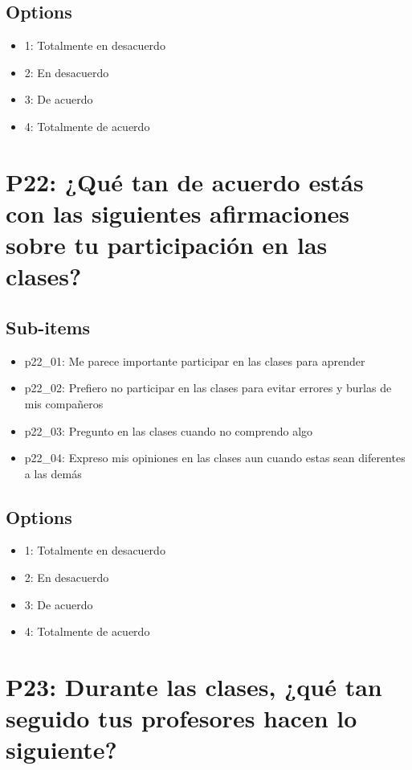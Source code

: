 \documentclass[11pt]{article}
\begin{document}
\subsection*{Options}
\begin{itemize}[leftmargin=*]
  \item 1: Totalmente en desacuerdo
  \item 2: En desacuerdo
  \item 3: De acuerdo
  \item 4: Totalmente de acuerdo
\end{itemize}
\bigskip
\section*{P22: ¿Qué tan de acuerdo estás con las siguientes afirmaciones sobre tu participación en las clases?}
\subsection*{Sub-items}
\begin{itemize}[leftmargin=*]
  \item p22\_01: Me parece importante participar en las clases para aprender
  \item p22\_02: Prefiero no participar en las clases para evitar errores y burlas de mis compañeros
  \item p22\_03: Pregunto en las clases cuando no comprendo algo
  \item p22\_04: Expreso mis opiniones en las clases aun cuando estas sean diferentes a las demás
\end{itemize}
\subsection*{Options}
\begin{itemize}[leftmargin=*]
  \item 1: Totalmente en desacuerdo
  \item 2: En desacuerdo
  \item 3: De acuerdo
  \item 4: Totalmente de acuerdo
\end{itemize}
\bigskip
\section*{P23: Durante las clases, ¿qué tan seguido tus profesores hacen lo siguiente?}
\end{document}
